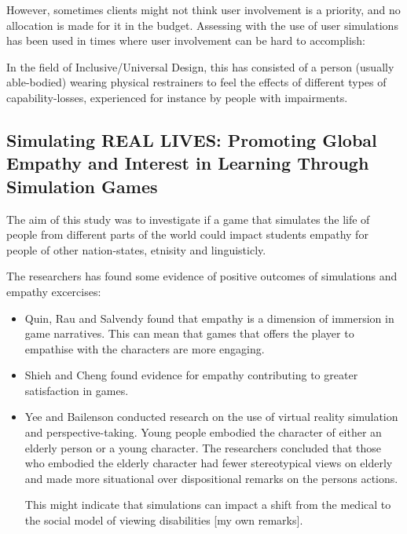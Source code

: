 However, sometimes clients might not think user involvement is a priority, and no allocation is made for it in the budget. Assessing with the use of user simulations has been used in times where user involvement can be hard to accomplish: 
\begin{displayquote}
    In the field of Inclusive/Universal Design, this has consisted of a person (usually able-bodied) wearing physical restrainers to feel the effects of different types of capability-losses, experienced for instance by people with impairments.
\end{displayquote}



\subsection{Simulating REAL LIVES: Promoting Global Empathy and Interest in Learning Through Simulation Games}
The aim of this study was to investigate if a game that simulates the life of people from different parts of the world could impact students empathy for people of other nation-states, etnisity and linguisticly.

The researchers has found some evidence of positive outcomes of simulations and empathy excercises:
\begin{itemize}
    \item Quin, Rau and Salvendy found that empathy is a dimension of immersion in game narratives. This can mean that games that offers the player to empathise with the characters are more engaging.
    \item Shieh and Cheng found evidence for empathy contributing to greater satisfaction in games.
    \item Yee and Bailenson conducted research on the use of virtual reality simulation and perspective-taking. Young people embodied the character of either an elderly person or a young character. The researchers concluded that those who embodied the elderly character had fewer stereotypical views on elderly and made more situational over dispositional remarks on the persons actions. 
    
    This might indicate that simulations can impact a shift from the medical to the social model of viewing disabilities [my own remarks].
\end{itemize}

